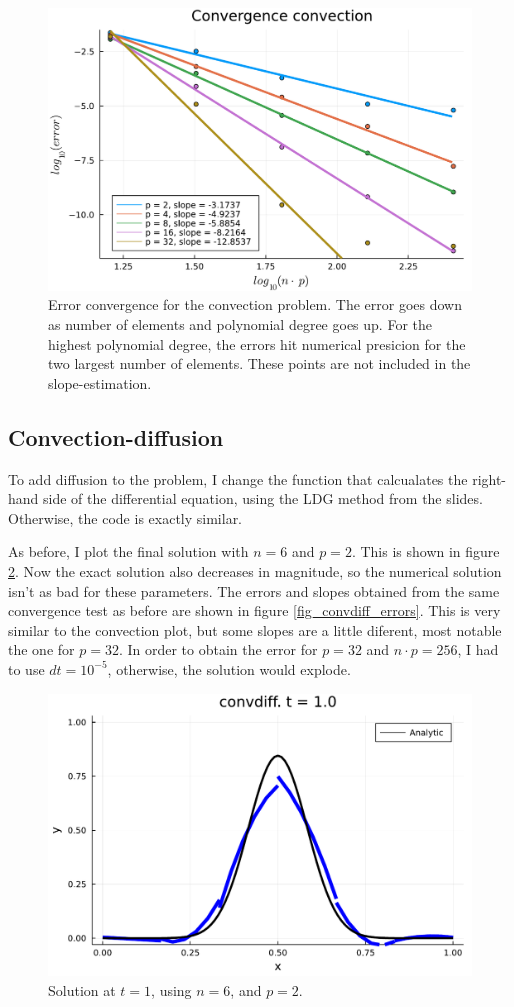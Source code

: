 \documentclass[aps, 12pt]{revtex4}
\begin{document}
\begin{figure}
    \includegraphics[width=0.75\linewidth]{conv_conv.pdf}
    \caption{Error convergence for the convection problem. The error goes down as number of elements and polynomial degree goes up. For the highest polynomial degree, the errors hit numerical presicion for the two largest number of elements. These points are not included in the slope-estimation. }
    \label{fig_convect_errors}
\end{figure}

\subsection*{Convection-diffusion}
To add diffusion to the problem, I change the function that calcualates the right-hand side of the differential equation, using the LDG method from the slides. Otherwise, the code is exactly similar.

As before, I plot the final solution with $n=6$ and $p=2$. This is shown in figure \ref{fig_convdiff_final_u}. Now the exact solution also decreases in magnitude, so the numerical solution isn't as bad for these parameters. The errors and slopes obtained from the same convergence test as before are shown in figure \ref{fig_convdiff_errors}. This is very similar to the convection plot, but some slopes are a little diferent, most notable the one for $p=32$. In  order to obtain the error for $p=32$ and $n\cdot p=256$, I had to use $dt=10^{-5}$, otherwise, the solution would explode.

\begin{figure}
    \includegraphics[width=0.75\linewidth]{u_finalconvdiff.pdf}
    \caption{Solution at $t=1$, using $n=6$, and $p=2$.}
    \label{fig_convdiff_final_u}
\end{figure}
\end{document}
